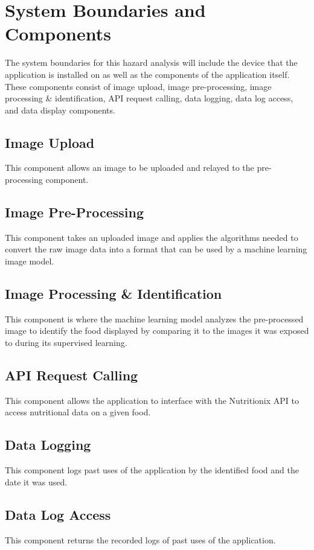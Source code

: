 \documentclass{article}
\begin{document}
\section{System Boundaries and Components}
The system boundaries for this hazard analysis will include the device that the application is installed on as well as the components of the application itself. These components consist of image upload, image pre-processing, image processing \& identification, API request calling, data logging, data log access, and data display components.

\subsection{Image Upload}
This component allows an image to be uploaded and relayed to the pre-processing component.

\subsection{Image Pre-Processing}
This component takes an uploaded image and applies the algorithms needed to convert the raw image data into a format that can be used by a machine learning image model.

\subsection{Image Processing \& Identification}
This component is where the machine learning model analyzes the pre-processed image to identify the food displayed by comparing it to the images it was exposed to during its supervised learning. 

\subsection{API Request Calling}
This component allows the application to interface with the Nutritionix API to access nutritional data on a given food.  

\subsection{Data Logging}
This component logs past uses of the application by the identified food and the date it was used.   

\subsection{Data Log Access}
This component returns the recorded logs of past uses of the application.
\end{document}
